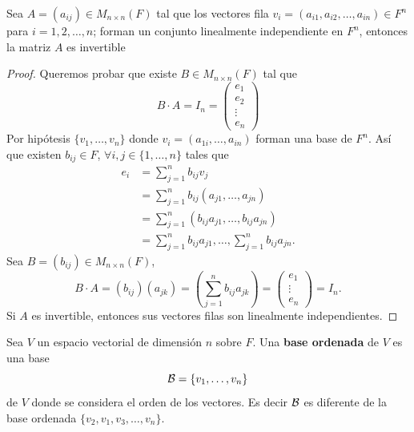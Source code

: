 \documentclass[12pt,a4paper]{book}
\newcommand{\parentesis}[1]{\left(#1\right)}
\begin{document}
    \begin{proposicion}
    \label{prop:21}
        Sea $A=(a_{ij})\in M_{n\times n}(F)$ tal que los vectores fila $v_{i}=(a_{i1},a_{i2},\dots,a_{in})\in F^{n}$
        para $i=1,2,\dots,n$; forman un conjunto linealmente independiente en $F^{n}$, entonces la
        matriz $A$ es invertible
    \end{proposicion}

    \begin{proof}
        Queremos probar que existe $B\in M_{n\times n}(F)$ tal que
        \begin{equation*}
            B\cdot A=I_{n}=
            \begin{pmatrix}
                e_{1}\\
                e_{2}\\
                \vdots\\
                e_{n}
            \end{pmatrix}
        \end{equation*}
        Por hipótesis $\{v_{1},\dots,v_{n}\}$ donde $v_{i}=(a_{1i},\dots,a_{in})$ forman una base de
        $F^{n}$. Así que existen $b_{ij}\in F$, $\forall i,j\in\{1,\dots,n\}$ tales que
        \begin{align*}
            e_{i}&=\sum_{j=1}^{n}b_{ij}v_{j}\\
            &=\sum_{j=1}^{n}b_{ij}(a_{j1},\dots,a_{jn})\\
            &=\sum_{j=1}^{n}(b_{ij}a_{j1},\dots,b_{ij}a_{jn})\\
            &=\sum_{j=1}^{n}b_{ij}a_{j1},\dots,\sum_{j=1}^{n}b_{ij}a_{jn}.
        \end{align*}
        Sea $B=(b_{ij})\in M_{n\times n}(F)$,
        \begin{equation*}
            B\cdot A=(b_{ij})(a_{jk})=\parentesis{\sum_{j=1}^{n}b_{ij}a_{jk}}=
            \begin{pmatrix}
                e_{1}\\
                \vdots\\
                e_{n}
            \end{pmatrix}
            =I_{n}.
        \end{equation*}
        Si $A$ es invertible, entonces sus vectores filas son linealmente independientes.
    \end{proof}

    \begin{definicion}
    \label{def:17}
        Sea $V$ un espacio vectorial de dimensión $n$ sobre $F$. Una \textbf{base ordenada}
        de $V$ es una base
        \begin{equation*}
            \mathcal{B}=\{v_{1},\dots,v_{n}\}
        \end{equation*}
        de $V$ donde se considera el orden de los vectores. Es decir $\mathcal{B}$ es diferente
        de la base ordenada $\{v_{2},v_{1},v_{3},\dots,v_{n}\}$.
    \end{definicion}
\end{document}
